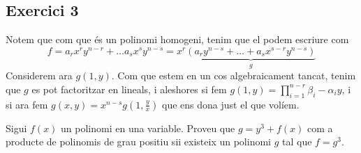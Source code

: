 \documentclass[11pt, a4paper]{article}
\begin{document}
\subsection{Exercici 3}
Notem que com que és un polinomi homogeni, tenim que el podem escriure com
\[
    f= a_rx^ry^{n-r}+\dots a_sx^sy^{n-s}=x^r\underbrace{(a_ry^{n-s}+\dots+a_sx^{s-r}y^{n-s})}_{g}
\]
Considerem ara $g(1,y)$. Com que estem en un cos algebraicament tancat, tenim que $g$ es pot factoritzar en lineals, i aleshores si fem $g(1,y) = \prod_{i=1}^{n-r} \beta_i - \alpha _iy$, i si ara fem $g(x,y)=x^{n-s}g\left(1,\frac{y}{x}\right)$ que ens dona just el que volíem.
\newpage
\begin{tcolorbox}[title=\section{Exercici 4}]
    Sigui $f(x)$ un polinomi en una variable. Proveu que $g=y^3+f(x)$ com a producte de polinomis de grau positiu sii existeix un polinomi $g$ tal que $f=g^3$.
\end{tcolorbox}
\end{document}

